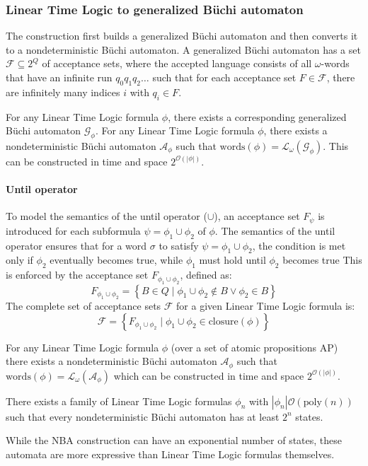 \subsubsection{Linear Time Logic to generalized Büchi automaton}
The construction first builds a generalized Büchi automaton and then converts it to a nondeterministic Büchi automaton. 
A generalized Büchi automaton has a set $\mathcal{F}\subseteq 2^Q$ of acceptance sets, where the accepted language consists of all $\omega$-words that have an infinite run $q_0q_1q_2\dots$ such that for each acceptance set $F \in \mathcal{F}$, there are infinitely many indices $i$ with $q_i\in F$.

For any Linear Time Logic formula $\phi$, there exists a corresponding generalized Büchi automaton $\mathcal{G}_{\phi}$. 
For any Linear Time Logic formula $\phi$, there exists a nondeterministic Büchi automaton $\mathcal{A}_\phi$ such that $\text{words}(\phi)=\mathcal{L}_{\omega}(\mathcal{G}_{\phi})$. 
This can be constructed in time and space $2^{\mathcal{O}(\left\lvert \phi\right\rvert )}$.

\paragraph*{Until operator}
To model the semantics of the until operator ($\cup$), an acceptance set $F_\psi$  is introduced for each subformula $\psi = \phi_1 \cup \phi_2$ of $\phi$.
The semantics of the until operator ensures that for a word $\sigma$ to satisfy $\psi = \phi_1 \cup \phi_2$, the condition is met only if $\phi_2$ eventually becomes true, while $\phi_1$ must hold until $\phi_2$ becomes true
This is enforced by the acceptance set $F_{\phi_1\cup\phi_2}$, defined as: 
\[F_{\phi_1\cup\phi_2}=\left\{B \in Q\mid\phi_1\cup\phi_2\notin B \lor \phi_2\in B\right\}\]
\noindent The complete set of acceptance sets $\mathcal{F}$ for a given Linear Time Logic formula is:
\[\mathcal{F}=\left\{F_{\phi_1\cup\phi_2}\mid\phi_1\cup\phi_2\in\text{closure}(\phi)\right\}\]

\begin{theorem}
    For any Linear Time Logic formula $\phi$ (over a set of atomic propositions $\text{AP}$) there exists a nondeterministic Büchi automaton $\mathcal{A}_\phi$ such that $\text{words}(\phi)=\mathcal{L}_{\omega}(\mathcal{A}_\phi)$ which can be constructed in time and space $2^{\mathcal{O}(\left\lvert \phi\right\rvert )}$.
\end{theorem}
\begin{theorem}
    There exists a family of Linear Time Logic formulas $\phi_n$ with $\left\lvert \phi_n\right\rvert\mathcal{O}(\text{poly}(n))$ such that every nondeterministic Büchi automaton has at least $2^n$ states. 
\end{theorem}
\noindent While the NBA construction can have an exponential number of states, these automata are more expressive than Linear Time Logic formulas themselves.

